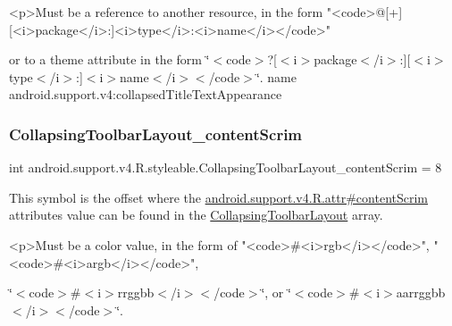 \begin{DoxyVerb}      <p>Must be a reference to another resource, in the form "<code>@[+][<i>package</i>:]<i>type</i>:<i>name</i></code>"
\end{DoxyVerb}
 or to a theme attribute in the form \char`\"{}$<$code$>$?\mbox{[}$<$i$>$package$<$/i$>$\+:\mbox{]}\mbox{[}$<$i$>$type$<$/i$>$\+:\mbox{]}$<$i$>$name$<$/i$>$$<$/code$>$\char`\"{}.  name android.\+support.\+v4\+:collapsed\+Title\+Text\+Appearance \mbox{\label{classandroid_1_1support_1_1v4_1_1R_1_1styleable_aee1e1a60d8efff968f52ae63c1b6859c}} 
\subsubsection{\texorpdfstring{Collapsing\+Toolbar\+Layout\+\_\+content\+Scrim}{CollapsingToolbarLayout\_contentScrim}}
{\footnotesize\ttfamily int android.\+support.\+v4.\+R.\+styleable.\+Collapsing\+Toolbar\+Layout\+\_\+content\+Scrim = 8\hspace{0.3cm}{\ttfamily [static]}}

This symbol is the offset where the \hyperlink{classandroid_1_1support_1_1v4_1_1R_1_1attr_a11f2cc81c0a1252de7118bf7a3adc19e}{android.\+support.\+v4.\+R.\+attr\#content\+Scrim} attribute\textquotesingle{}s value can be found in the \hyperlink{classandroid_1_1support_1_1v4_1_1R_1_1styleable_a91b20e27088c910353d38c1efde32aa9}{Collapsing\+Toolbar\+Layout} array.

\begin{DoxyVerb}      <p>Must be a color value, in the form of "<code>#<i>rgb</i></code>", "<code>#<i>argb</i></code>",
\end{DoxyVerb}
 \char`\"{}$<$code$>$\#$<$i$>$rrggbb$<$/i$>$$<$/code$>$\char`\"{}, or \char`\"{}$<$code$>$\#$<$i$>$aarrggbb$<$/i$>$$<$/code$>$\char`\"{}. 

